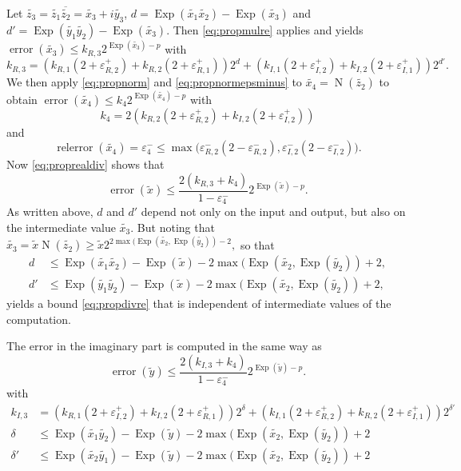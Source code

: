 \documentclass [11pt]{article}
\newcommand {\appro}[1]{\widetilde {#1}}
\DeclareMathOperator{\Exp}{\operatorname {Exp}}
\newcommand{\error}{\operatorname {error}}
\newcommand{\relerror}{\operatorname {relerror}}
\newcommand{\Norm}{\operatorname {N}}
\renewcommand {\epsilon}{\varepsilon}
\renewcommand {\leq}{\leqslant}
\renewcommand {\geq}{\geqslant}
\begin{document}
Let $\appro {z_3} = \appro {z_1} \overline {\appro {z_2}}
= \appro {x_3} + i \appro {y_3}$,
$d = \Exp (\appro {x_1} \appro {x_2}) - \Exp (\appro {x_3})$
and $d' = \Exp (\appro {y_1} \appro {y_2}) - \Exp (\appro {x_3})$.
Then \eqref {eq:propmulre} applies and yields
$\error (\appro {x_3}) \leq k_{R, 3} 2^{\Exp (\appro {x_3}) - p}$
with
\[
k_{R, 3} = \left( k_{R, 1} (2 + \epsilon_{R, 2}^+)
   + k_{R, 2} (2 + \epsilon_{R, 1}^+) \right) 2^d
   + \left( k_{I, 1} (2 + \epsilon_{I, 2}^+)
   + k_{I, 2} (2 + \epsilon_{I, 1}^+) \right) 2^{d'}.
\]
We then apply \eqref {eq:propnorm} and \eqref {eq:propnormepsminus}
to $\appro {x_4} = \Norm (\appro {z_2})$ to  obtain
$\error (\appro {x_4}) \leq k_4 2^{\Exp (\appro {x_4}) - p}$ with
\[
k_4 =   2 \left(
       k_{R, 2} (2 + \epsilon_{R, 2}^+)
     + k_{I, 2} (2 + \epsilon_{I, 2}^+)
\right)
\]
and
\[
\relerror (\appro {x_4}) = \epsilon_4^-
\leq
\max \big(
   \epsilon_{R, 2}^- (2 - \epsilon_{R, 2}^-),
   \epsilon_{I, 2}^- (2 - \epsilon_{I, 2}^-)
\big).
\]
Now \eqref {eq:proprealdiv} shows that
\begin {equation}
\label {eq:propdivre}
\error (\appro x)
\leq
\frac {2 (k_{R, 3} + k_4)}{1 - \epsilon_4^-} 2^{\Exp (\appro x) - p}.
\end {equation}
As written above, $d$ and $d'$ depend not only on the input and output, but
also on the intermediate value $\appro {x_3}$. But noting that
$
\appro {x_3} = \appro x \Norm (\appro {z_2})
\geq
\appro x 2^{2 \max (\Exp (\appro {x_2}, \Exp (\appro {y_2})) - 2},
$
so that
\begin {align*}
d &\leq
\Exp (\appro {x_1} \appro {x_2}) - \Exp (\appro x)
- 2 \max (\Exp (\appro {x_2}, \Exp (\appro {y_2})) + 2, \\
d' &\leq
\Exp (\appro {y_1} \appro {y_2}) - \Exp (\appro x)
- 2 \max (\Exp (\appro {x_2}, \Exp (\appro {y_2})) + 2,
\end {align*}
yields a bound \eqref {eq:propdivre} that is independent of
intermediate values of the computation.

The error in the imaginary part is computed in the same way as
\begin {equation}
\label {eq:propdivim}
\error (\appro y)
\leq
\frac {2 (k_{I, 3} + k_4)}{1 - \epsilon_4^-} 2^{\Exp (\appro y) - p}.
\end {equation}
with
\begin {align*}
k_{I, 3}
&= \left( k_{R, 1} (2 + \epsilon_{I, 2}^+)
   + k_{I, 2} (2 + \epsilon_{R, 1}^+) \right) 2^\delta
   + \left( k_{I, 1} (2 + \epsilon_{R, 2}^+)
   + k_{R, 2} (2 + \epsilon_{I, 1}^+) \right) 2^{\delta'} \\
\delta &\leq
\Exp (\appro {x_1} \appro {y_2}) - \Exp (\appro y)
- 2 \max (\Exp (\appro {x_2}, \Exp (\appro {y_2})) + 2 \\
\delta' &\leq
\Exp (\appro {x_2} \appro {y_1}) - \Exp (\appro y)
- 2 \max (\Exp (\appro {x_2}, \Exp (\appro {y_2})) + 2
\end {align*}
\end{document}

